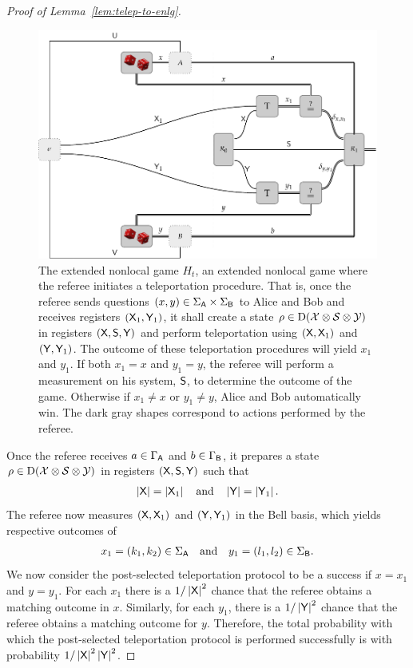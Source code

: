 \begin{proof}[Proof of Lemma~\ref{lem:telep-to-enlg}]
\begin{figure}[!htpb] 
	\begin{center}
		\includegraphics[scale=1.0]{figures/G2.pdf}
	\end{center}
		\caption[The extended nonlocal game $H_t$.]{The extended nonlocal game $H_t$, an extended nonlocal game where the referee initiates a teleportation procedure. That is, once the referee sends questions $(x,y) \in \Sigma_{\mathsf{A}} \times \Sigma_{\mathsf{B}}$ to Alice and Bob and receives registers $(\mathsf{X}_1,\mathsf{Y}_1)$, it shall create a state $\rho \in \mathrm{D}(\mathcal{X} \otimes \mathcal{S} \otimes \mathcal{Y})$ in registers $(\mathsf{X},\mathsf{S},\mathsf{Y})$ and perform teleportation using $(\mathsf{X},\mathsf{X}_1)$ and $(\mathsf{Y},\mathsf{Y}_1)$. The outcome of these teleportation procedures will yield $x_1$ and $y_1$. If both $x_1 = x$ and $y_1 = y$, the referee will perform a measurement on his system, $\mathsf{S}$, to determine the outcome of the game. Otherwise if $x_1 \not= x$ or $y_1 \not= y$, Alice and Bob automatically win. The dark gray shapes correspond to actions performed by the referee.}
		\label{fig:G2}
\end{figure}

Once the referee receives $a \in \Gamma_{\mathsf{A}}$ and $b \in \Gamma_{\mathsf{B}}$, it prepares a state $\rho \in \mathrm{D}(\mathcal{X} \otimes \mathcal{S} \otimes \mathcal{Y})$ in registers $(\mathsf{X},\mathsf{S},\mathsf{Y})$ such that 
\begin{align}
	\left\lvert \mathsf{X} \right\rvert = \left\lvert \mathsf{X}_1 \right\rvert \quad \textnormal{and} \quad \left\lvert \mathsf{Y} \right\rvert = \left\lvert \mathsf{Y}_1 \right\rvert.
\end{align}
The referee now measures $(\mathsf{X},\mathsf{X}_1)$ and $(\mathsf{Y},\mathsf{Y}_1)$ in the Bell basis, which yields respective outcomes of 
\begin{align}
	x_1 = (k_1,k_2) \in \Sigma_{\mathsf{A}} \quad \textnormal{and} \quad y_1 = (l_1,l_2) \in \Sigma_{\mathsf{B}}.
\end{align}
We now consider the post-selected teleportation protocol to be a success if $x = x_1$ and $y = y_1$. For each $x_1$ there is a $1/\left\lvert \mathsf{X} \right\rvert^2$ chance that the referee obtains a matching outcome in $x$. Similarly, for each $y_1$, there is a $1/\left\lvert \mathsf{Y} \right\rvert^2$ chance that the referee obtains a matching outcome for $y$. Therefore, the total probability with which the post-selected teleportation protocol is performed successfully is with probability $1/\left\lvert \mathsf{X} \right\rvert^2\left\lvert \mathsf{Y} \right\rvert^2$. 


\end{proof}
